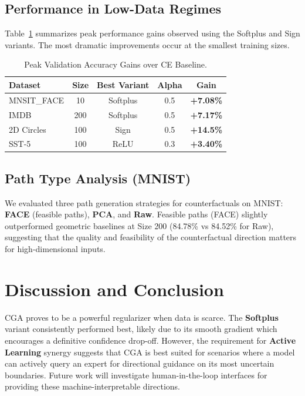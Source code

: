 \documentclass[sigconf,anonymous]{aamas}
\begin{document}
\subsection{Performance in Low-Data Regimes}
Table~\ref{tab:main_results} summarizes peak performance gains observed using the Softplus and Sign variants. The most dramatic improvements occur at the smallest training sizes.

\begin{table}[h]
\centering
\caption{Peak Validation Accuracy Gains over CE Baseline.}
\label{tab:main_results}
\begin{tabular}{@{}lcccc@{}}
\toprule
\textbf{Dataset} & \textbf{Size} & \textbf{Best Variant} & \textbf{Alpha} & \textbf{Gain} \\ \midrule
MNSIT_FACE & 10 & Softplus & 0.5 & \textbf{+7.08\%}
 \\ 
IMDB & 200 & Softplus & 0.5 & \textbf{+7.17\%}
 \\ 
2D Circles & 100 & Sign & 0.5 & \textbf{+14.5\%}
 \\ 
SST-5 & 100 & ReLU & 0.3 & \textbf{+3.40\%}
 \\ \bottomrule
\end{tabular}
\end{table}

\subsection{Path Type Analysis (MNIST)}
We evaluated three path generation strategies for counterfactuals on MNIST: \textbf{FACE} (feasible paths), \textbf{PCA}, and \textbf{Raw}. Feasible paths (FACE) slightly outperformed geometric baselines at Size 200 (84.78\% vs 84.52\% for Raw), suggesting that the quality and feasibility of the counterfactual direction matters for high-dimensional inputs.

\section{Discussion and Conclusion}
CGA proves to be a powerful regularizer when data is scarce. The \textbf{Softplus} variant consistently performed best, likely due to its smooth gradient which encourages a definitive confidence drop-off. However, the requirement for \textbf{Active Learning} synergy suggests that CGA is best suited for scenarios where a model can actively query an expert for directional guidance on its most uncertain boundaries. Future work will investigate human-in-the-loop interfaces for providing these machine-interpretable directions.

\balance



\end{document}
